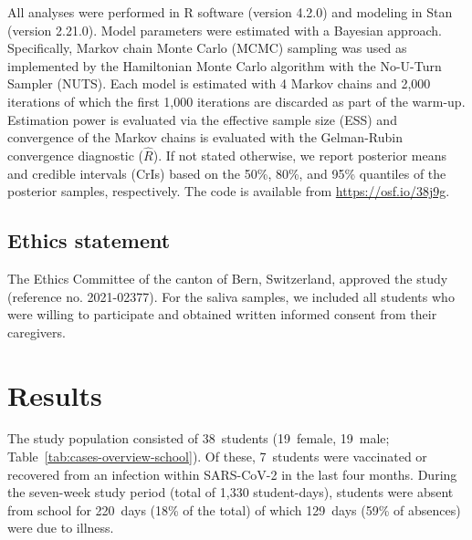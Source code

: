 \documentclass[fleqn,11pt]{wlscirep}
\begin{document}
\noindent All analyses were performed in R software (version 4.2.0)\cite{RCoreTeam2022} and modeling in Stan (version 2.21.0)\cite{Carpenter2017}. Model parameters were estimated with a Bayesian approach. Specifically, Markov chain Monte Carlo (MCMC) sampling was used as implemented by the Hamiltonian Monte Carlo algorithm with the No-U-Turn Sampler (NUTS)\cite{Hoffman2014}. Each model is estimated with 4 Markov chains and 2,000 iterations of which the first 1,000 iterations are discarded as part of the warm-up. Estimation power is evaluated via the effective sample size (ESS) and convergence of the Markov chains is evaluated with the Gelman-Rubin convergence diagnostic ($\hat{R}$). If not stated otherwise, we report posterior means and credible intervals (CrIs) based on the 50\%, 80\%, and 95\% quantiles of the posterior samples, respectively. The code is available from \url{https://osf.io/38j9g}.



\subsection{Ethics statement}

\noindent The Ethics Committee of the canton of Bern, Switzerland, approved the study (reference no. 2021-02377). For the saliva samples, we included all students who were willing to participate and obtained written informed consent from their caregivers.


\newpage

\section{Results}

The study population consisted of 38~students (19~female, 19~male; Table~\ref{tab:cases-overview-school}). Of these, 7~students were vaccinated or recovered from an infection within SARS-CoV-2 in the last four months. During the seven-week study period (total of 1,330 student-days), students were absent from school for 220~days (18\% of the total) of which 129~days (59\% of absences) were due to illness.  
\end{document}
